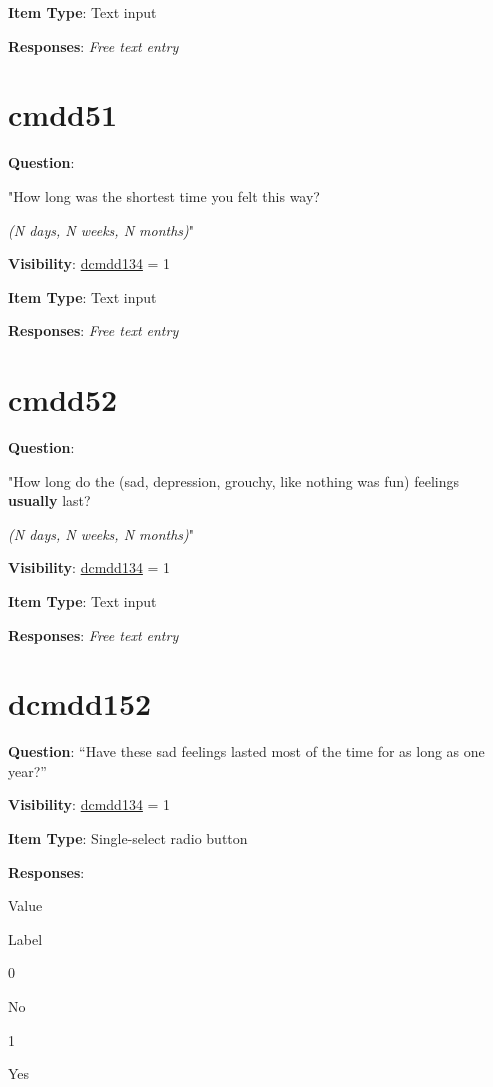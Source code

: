 \documentclass[
]{book}
\begin{document}
\textbf{Item Type}: Text input

\textbf{Responses}: \emph{Free text entry}

\hypertarget{cmdd51}{%
\section{cmdd51}\label{cmdd51}}

\textbf{Question}:

"How long was the shortest time you felt this way?

\emph{(N days, N weeks, N months)}"

\textbf{Visibility}: \protect\hyperlink{dcmdd134}{dcmdd134} = 1

\textbf{Item Type}: Text input

\textbf{Responses}: \emph{Free text entry}

\hypertarget{cmdd52}{%
\section{cmdd52}\label{cmdd52}}

\textbf{Question}:

"How long do the (sad, depression, grouchy, like nothing was fun) feelings \textbf{usually} last?

\emph{(N days, N weeks, N months)}"

\textbf{Visibility}: \protect\hyperlink{dcmdd134}{dcmdd134} = 1

\textbf{Item Type}: Text input

\textbf{Responses}: \emph{Free text entry}

\hypertarget{dcmdd152}{%
\section{dcmdd152}\label{dcmdd152}}

\textbf{Question}: ``Have these sad feelings lasted most of the time for as long as one year?''

\textbf{Visibility}: \protect\hyperlink{dcmdd134}{dcmdd134} = 1

\textbf{Item Type}: Single-select radio button

\textbf{Responses}:

Value

Label

0

No

1

Yes
\end{document}
